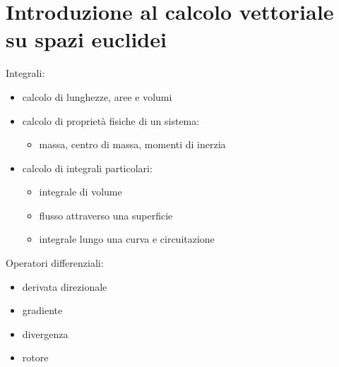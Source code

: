\documentclass[letterpaper,10pt,english]{jupyterBook}
\begin{document}
\chapter{Introduzione al calcolo vettoriale su spazi euclidei}
\label{\detokenize{ch/vector-calculus:introduzione-al-calcolo-vettoriale-su-spazi-euclidei}}\label{\detokenize{ch/vector-calculus:vector-calculus}}\label{\detokenize{ch/vector-calculus::doc}}
\sphinxAtStartPar
Integrali:
\begin{itemize}
\item {} 
\sphinxAtStartPar
calcolo di lunghezze, aree e volumi

\item {} 
\sphinxAtStartPar
calcolo di proprietà fisiche di un sistema:
\begin{itemize}
\item {} 
\sphinxAtStartPar
massa, centro di massa, momenti di inerzia

\end{itemize}

\item {} 
\sphinxAtStartPar
calcolo di integrali particolari:
\begin{itemize}
\item {} 
\sphinxAtStartPar
integrale di volume

\item {} 
\sphinxAtStartPar
flusso attraverso una superficie

\item {} 
\sphinxAtStartPar
integrale lungo una curva e circuitazione

\end{itemize}

\end{itemize}

\sphinxAtStartPar
Operatori differenziali:
\begin{itemize}
\item {} 
\sphinxAtStartPar
derivata direzionale

\item {} 
\sphinxAtStartPar
gradiente

\item {} 
\sphinxAtStartPar
divergenza

\item {} 
\sphinxAtStartPar
rotore

\end{itemize}

\sphinxstepscope
\end{document}
